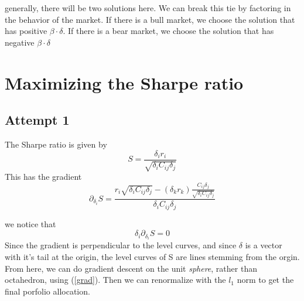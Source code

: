 \documentclass[10pt,letterpaper,oneside]{article}
\begin{document}
generally, there will be two solutions here. We can break this tie by factoring in the behavior of the market. If there is a bull market, we choose the solution that has positive $\beta\cdot \delta$. If there is a bear market, we choose the solution that has negative $\beta\cdot \delta$

\section{Maximizing the Sharpe ratio}
\subsection{Attempt 1}
The Sharpe ratio is given by
\begin{equation}
S=\frac{\delta_i r_i}{\sqrt{\delta_i C_{ij}\delta_j}}
\end{equation}
This has the gradient
\begin{equation}\label{grad}
\partial_{\delta_i}S=\frac{r_i \sqrt{\delta_i C_{ij}\delta_j}-(\delta_k r_k)\frac{C_{ij}\delta_j}{\sqrt{\delta_i C_{ij}\delta_j}}}{\delta_i C_{ij}\delta_j}
\end{equation}

we notice that 
\begin{equation}
\delta_i \partial_{\delta_i}S=0
\end{equation}
Since the gradient is perpendicular to the level curves, and since $\delta $ is a vector with it's tail at the origin, the level curves of S are lines stemming from the orgin. From here, we can do gradient descent on the unit \emph{sphere}, rather than octahedron, using (\ref{grad}). Then we can renormalize with the $l_1$ norm to get the final porfolio allocation.
\end{document}
